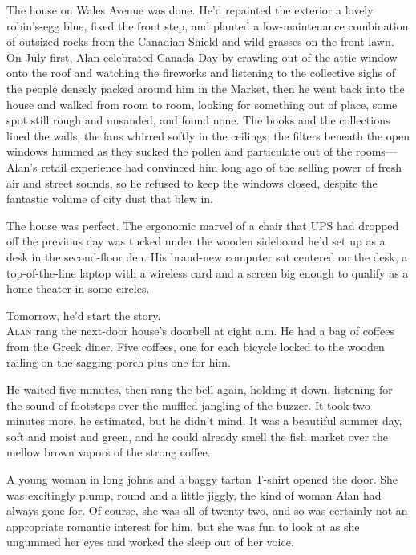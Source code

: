 The house on Wales Avenue was done.  He'd repainted the exterior a
lovely robin's-egg blue, fixed the front step, and planted a
low-maintenance combination of outsized rocks from the Canadian Shield
and wild grasses on the front lawn.  On July first, Alan celebrated
Canada Day by crawling out of the attic window onto the roof and
watching the fireworks and listening to the collective sighs of the
people densely packed around him in the Market, then he went back into
the house and walked from room to room, looking for something out of
place, some spot still rough and unsanded, and found none.  The books
and the collections lined the walls, the fans whirred softly in the
ceilings, the filters beneath the open windows hummed as they sucked
the pollen and particulate out of the rooms---Alan's retail experience
had convinced him long ago of the selling power of fresh air and
street sounds, so he refused to keep the windows closed, despite the
fantastic volume of city dust that blew in.

The house was perfect.  The ergonomic marvel of a chair that UPS had
dropped off the previous day was tucked under the wooden sideboard
he'd set up as a desk in the second-floor den.  His brand-new computer
sat centered on the desk, a top-of-the-line laptop with a wireless
card and a screen big enough to qualify as a home theater in some
circles.

Tomorrow, he'd start the story.
\\
\lettrine[lines=3, lhang=.5, nindent=0pt, findent=2pt]{A}{lan} rang the next-door house's doorbell at eight a.m.  He had a bag
of coffees from the Greek diner.  Five coffees, one for each bicycle
locked to the wooden railing on the sagging porch plus one for him.

He waited five minutes, then rang the bell again, holding it down,
listening for the sound of footsteps over the muffled jangling of the
buzzer.  It took two minutes more, he estimated, but he didn't mind. 
It was a beautiful summer day, soft and moist and green, and he could
already smell the fish market over the mellow brown vapors of the
strong coffee.

A young woman in long johns and a baggy tartan T-shirt opened the
door.  She was excitingly plump, round and a little jiggly, the kind
of woman Alan had always gone for.  Of course, she was all of
twenty-two, and so was certainly not an appropriate romantic interest
for him, but she was fun to look at as she ungummed her eyes and
worked the sleep out of her voice.

